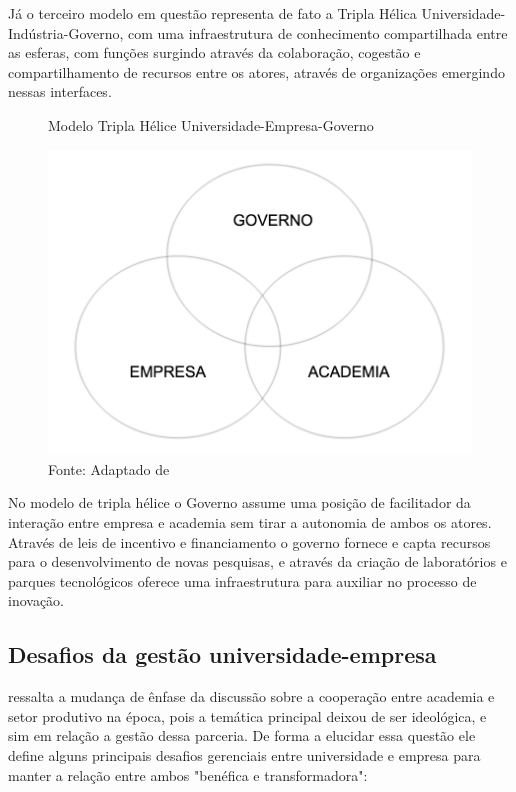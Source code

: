 Já o terceiro modelo em questão representa de fato a Tripla Hélica Universidade-Indústria-Governo, com uma infraestrutura de conhecimento compartilhada entre as esferas, com funções surgindo através da colaboração, cogestão e compartilhamento de recursos entre os atores, através de organizações emergindo nessas interfaces.


\begin{figure}[H]
\caption{Modelo Tripla Hélice Universidade-Empresa-Governo}
\centerline{\includegraphics[scale=0.5]{img/triplehelix3}}
\label{fig:triplehelix3}
\caption* {Fonte: Adaptado de }
\end{figure}

No modelo de tripla hélice o Governo assume uma posição de facilitador da interação entre empresa e academia sem tirar a autonomia de ambos os atores. Através de leis de incentivo e financiamento o governo fornece e capta recursos para o desenvolvimento de novas pesquisas, e através da criação de laboratórios e parques tecnológicos oferece uma infraestrutura para  auxiliar no processo de inovação.

\subsection{Desafios da gestão universidade-empresa}
\label{cha:univ_empreend}

 ressalta a mudança de ênfase da discussão sobre a cooperação entre academia e setor produtivo na época, pois a temática principal deixou de ser ideológica, e sim em relação a gestão dessa parceria. De forma a elucidar essa questão ele define alguns principais desafios gerenciais entre universidade e empresa para manter a relação entre ambos "benéfica e transformadora":


